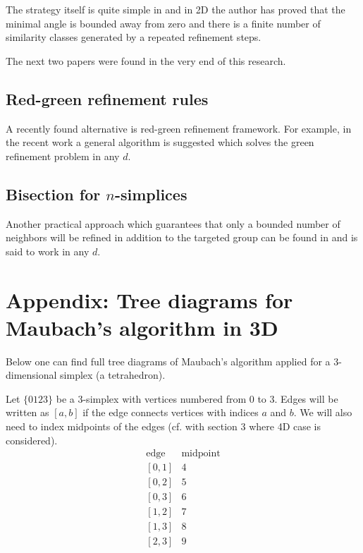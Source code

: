 \documentclass[a4paper,12pt]{amsart}
\numberwithin{equation}{section}
\begin{document}
The strategy itself is quite simple in \cite{rivara} and in 2D the author has proved that the minimal angle is bounded away from zero and there is a finite number of similarity classes generated by a repeated refinement steps.

The next two papers were found in the very end of this research.

\subsection{Red-green refinement rules}
A recently found alternative is red-green refinement framework. For example, in the recent work \cite{grande} a general algorithm is suggested which solves the green refinement problem in any $d$.

\subsection{Bisection for $n$-simplices}
Another practical approach which guarantees that only a bounded number of neighbors will be refined  in addition to the targeted group can be found in \cite{stevenson} and is said to work in any $d$.


\section{Appendix: Tree diagrams for Maubach's algorithm in 3D}

Below one can find full tree diagrams of Maubach's algorithm applied for a 3-dimensional simplex (a tetrahedron).

Let $\{0123\}$ be a 3-simplex with vertices numbered from 0 to 3. Edges will be written as $[a,b]$ if the edge connects vertices with indices $a$ and $b$.
We will also need to index midpoints of the edges (cf. with section 3 where 4D case is considered). 
$$
\begin{array}{cc}
\mbox{edge} & \mbox{midpoint} \\
\left[0,1\right] & 4 \\
\left[0,2\right] & 5 \\
\left[0,3\right] & 6 \\
\left[1,2\right] & 7 \\
\left[1,3\right] & 8 \\
\left[2,3\right] & 9 \\
\end{array}
$$

\end{document}
